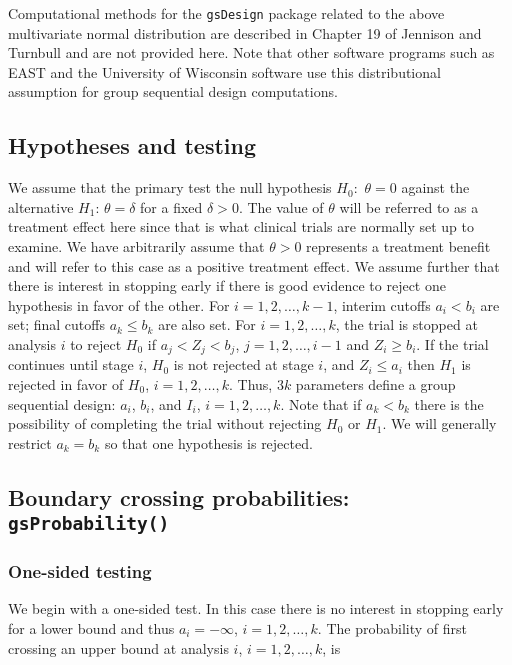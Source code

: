 Computational methods for the \texttt{gsDesign} package related to the above multivariate normal distribution are described in Chapter 19 of Jennison and Turnbull \cite{JTBook} and are not provided here. Note that other software programs such as EAST and the University of Wisconsin software use this distributional assumption for group sequential design computations.

\subsection{Hypotheses and testing}
We assume that the primary
test the null hypothesis $H_{0}$:~$\theta=0$ against the alternative $H_{1}$:
$\theta=\delta$ for a fixed $\delta>0$. The value of $\theta$ will be referred to as a treatment effect here since that is what clinical trials are normally set up to examine. We have arbitrarily assume that $\theta>0$ represents a treatment benefit and will refer to this case as a positive treatment effect. 
We assume further that there is
interest in stopping early if there is good evidence to reject one hypothesis
in favor of the other. For $i=1,2,\ldots,k-1$, interim cutoffs $a_{i}<b_{i}$
are set; final cutoffs $a_{k}\leq b_{k}$ are also set. For $i=1,2,\ldots,k$,
the trial is stopped at analysis $i$ to reject $H_{0}$ if $a_{j}<Z_{j}<b_{j}$,
$j=1,2,\dots,i-1$ and $Z_{i}\geq b_{i}$. If the trial continues until stage
$i$, $H_{0}$ is not rejected at stage $i$, and $Z_{i}\leq a_{i}$ then $H_{1}$
is rejected in favor of $H_{0}$, $i=1,2,\ldots,k$. Thus, $3k$ parameters
define a group sequential design: $a_{i}$, $b_{i}$, and $I_{i}$,
$i=1,2,\ldots,k$. Note that if $a_{k}<b_{k}$ there is the possibility of
completing the trial without rejecting $H_{0}$ or $H_{1}$. We will generally
restrict $a_{k}=b_{k}$ so that one hypothesis is rejected.


\subsection{Boundary crossing probabilities: \texttt{gsProbability()}\label{sec:gsProbability}}
\subsubsection{One-sided testing\label{sec:1sidedtest}}
We begin with a one-sided test. 
In this case there is no interest in stopping early for a lower bound and thus $a_i= -\infty$, $i=1,2,\ldots,k$.
The probability of first crossing an upper bound at analysis $i$, $i=1,2,\ldots,k$, is

